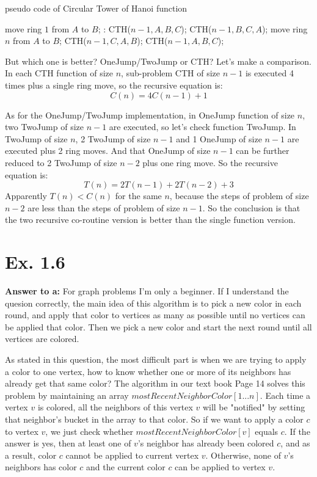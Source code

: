 \documentclass[a4paper,11pt]{article}
\theoremstyle{mytheor}
\begin{document}
\begin{algorithm}[H]
\caption{pseudo code of Circular Tower of Hanoi function}\label{CTH}
\begin{algorithmic}[1]
    \State move ring $1$ from $A$ to $B$;
  \Else:
    \State CTH($n-1, A, B, C$);
    \State CTH($n-1, B, C, A$);
    \State move ring $n$ from $A$ to $B$;
    \State CTH($n-1, C, A, B$);
    \State CTH($n-1, A, B, C$);
  \EndIf
\EndProcedure
\end{algorithmic}
\end{algorithm}
But which one is better? OneJump/TwoJump or CTH?
Let's make a comparison.
In each CTH function of size $n$, sub-problem CTH of size $n-1$ is executed 4 times plus a single ring move, so the recursive equation is:
$$
C(n) = 4C(n-1) + 1
$$

As for the OneJump/TwoJump implementation, in OneJump function of size $n$, two TwoJump of size $n-1$ are executed, so let's check function TwoJump. In TwoJump of size $n$, 2 TwoJump of size $n-1$ and 1 OneJump of size $n-1$ are executed plus 2 ring moves. And that OneJump of size $n-1$ can be further reduced to 2 TwoJump of size $n-2$ plus one ring move. So the recursive equation is:
$$
T(n) = 2T(n-1) + 2T(n-2) + 3
$$
Apparently $T(n) < C(n)$ for the same $n$, because the steps of problem of size $n-2$ are less than the steps of problem of size $n-1$. So the conclusion is that the two recursive co-routine version is better than the single function version.

\vspace{1.2in}

\section*{Ex. 1.6}
\textbf{Answer to a:} For graph problems I'm only a beginner. If I understand the quesion correctly, the main idea of this algorithm is to pick a new color in each round, and apply that color to vertices as many as possible until no vertices can be applied that color. Then we pick a new color and start the next round until all vertices are colored.

As stated in this question, the most difficult part is when we are trying to apply a color to one vertex, how to know whether one or more of its neighbors has already get that same color? The algorithm in our text book Page 14 solves this problem by maintaining an array $mostRecentNeighborColor[1...n]$. Each time a vertex $v$ is colored, all the neighbors of this vertex $v$ will be "notified" by setting that neighbor's bucket in the array to that color. So if we want to apply a color $c$ to  vertex $v$, we just check whether $mostRecentNeighborColor[v]$ equals $c$. If the answer is yes, then at least one of $v$'s neighbor has already been colored $c$, and as a result, color $c$ cannot be applied to current vertex $v$. Otherwise, none of $v$'s neighbors has color $c$ and the current color $c$ can be applied to vertex $v$.
\end{document}
